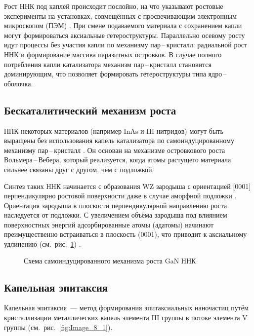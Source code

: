 Рост ННК под каплей происходит послойно, на что указывают ростовые эксперименты
на установках, совмещённых с просвечивающим электронным микроскопом (ПЭМ)
\cite{Hofmann2008, Wen2009, Jacobsson2016}. При смене подаваемого материала с
сохранением капли могут формироваться аксиальные гетероструктуры. Параллельно
осевому росту идут процессы без участия капли по механизму пар\,--\,кристалл:
радиальной рост ННК и формирование массива паразитных островков. В случае
полного потребления капли катализатора механизм пар\,--\,кристалл становится
доминирующим, что позволяет формировать гетероструктуры типа
ядро\,--\,оболочка.

\subsection{Бескаталитический механизм роста}\label{subsec:ch1/sec2/sub7}

ННК некоторых материалов (например InAs и III-нитридов) могут быть выращены без
использования капель катализатора по самоиндуцированному механизму
пар\,--\,кристалл \cite{Ristic2008, Bolshakov2014}. Он основан на механизме
островкового роста Вольмера\,--\,Вебера, который реализуется, когда атомы
растущего материала сильнее связаны друг с другом, чем с подложкой.

Синтез таких ННК начинается с образования WZ зародыша с ориентацией [0001]
перпендикулярно ростовой поверхности даже в случае аморфной подложки
\cite{Stoica2008, Corfdir2009}. Ориентация зародыша в плоскости
перпендикулярной направлению роста наследуется от подложки. С увеличением
объёма зародыша под влиянием поверхностных энергий адсорбированные атомы
(адатомы) начинают преимущественно встраиваться в плоскость (0001), что
приводит к аксиальному удлинению (см.~рис.~\cref{fig:Image_9})
\cite{Dubrovskii2012b}.

\begin{figure}[ht]  \caption{Схема самоиндуцированного механизма роста GaN ННК
		\cite{Dubrovskii2012b}}\label{fig:Image_9} \end{figure}

\subsection{Капельная эпитаксия}\label{subsec:ch1/sec2/sub6}

Капельная эпитаксия~--- метод формирования эпитаксиальных наночастиц путём
кристаллизации металлических капель элемента III группы в потоке элемента V
группы (см.~рис.~\cref{fig:Image_8_1}).


